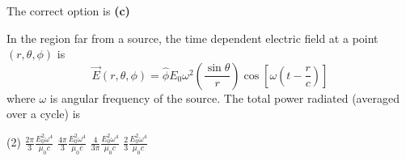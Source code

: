 \begin{enumerate}
\begin{answer}
$$	$$
	The correct option is \textbf{(c)}
\end{answer}
\begin{minipage}{\textwidth}
	\item In the region far from a source, the time dependent electric field at a point $(r, \theta, \phi)$ is
	$$
	\vec{E}(r, \theta, \phi)=\hat{\phi} E_{0} \omega^{2}\left(\frac{\sin \theta}{r}\right) \cos \left[\omega\left(t-\frac{r}{c}\right)\right]
	$$
	where $\omega$ is angular frequency of the source. The total power radiated (averaged over a cycle) is
\end{minipage}
\begin{tasks}(2)
	\task[\textbf{A.}] $\frac{2 \pi}{3} \frac{E_{0}^{2} \omega^{4}}{\mu_{0} c}$
	\task[\textbf{B.}]$\frac{4 \pi}{3} \frac{E_{0}^{2} \omega^{4}}{\mu_{0} c}$
	\task[\textbf{C.}]$\frac{4}{3 \pi} \frac{E_{0}^{2} \omega^{4}}{\mu_{0} c}$
	\task[\textbf{D.}]$\frac{2}{3} \frac{E_{0}^{2} \omega^{4}}{\mu_{0} c}$
\end{tasks}
\begin{answer}
	

\end{answer}
\end{enumerate}
